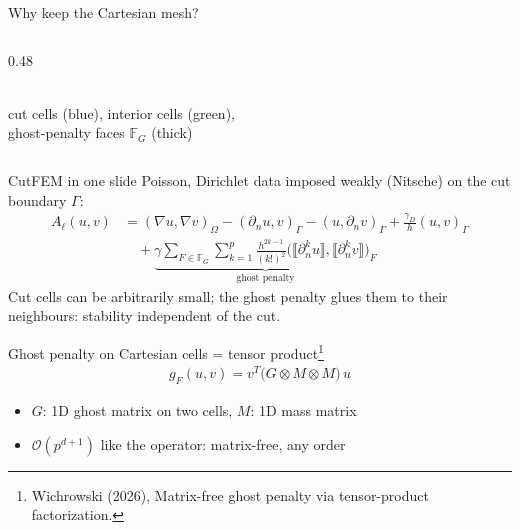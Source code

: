 \documentclass{beamer}
\begin{document}
\begin{frame}{Why keep the Cartesian mesh?}
\begin{columns}[T]
\begin{column}{0.48\textwidth}
\\[0.3em]
            {\scriptsize cut cells (blue), interior cells (green),\\ ghost-penalty faces $\mathbb F_G$ (thick)}
        \end{column}
    \end{columns}
\end{frame}

\begin{frame}{CutFEM in one slide}
    \small
    Poisson, Dirichlet data imposed weakly (Nitsche) on the cut boundary $\Gamma$:
    \begin{align*}
        A_\ell(u,v) & = (\nabla u,\nabla v)_\Omega - (\partial_n u, v)_\Gamma - (u,\partial_n v)_\Gamma
        + \tfrac{\gamma_D}{h}(u,v)_\Gamma                                                                    \\
                    & \quad + \underbrace{\gamma\sum_{F\in\mathbb F_G}\sum_{k=1}^{p}\tfrac{h^{2k-1}}{(k!)^2}
            \big(\llbracket\partial_n^k u\rrbracket, \llbracket\partial_n^k v\rrbracket\big)_F}_{\text{ghost penalty}}
    \end{align*}
    Cut cells can be \alert{arbitrarily small}; the \alert{ghost penalty} glues them to their neighbours:
    stability independent of the cut.
    \pause
    \begin{block}{Ghost penalty on Cartesian cells = tensor product\footnote{Wichrowski (2026), Matrix-free ghost penalty
                via tensor-product factorization.}}
        \vspace{-1.2em}
        \begin{gather*}
            g_F(u,v) = v^T \bigl(G \otimes M \otimes M\bigr)\, u
        \end{gather*}
        \vspace{-1.8em}
        \begin{itemize}
            \item $G$: 1D ghost matrix on two cells, $M$: 1D mass matrix
            \item $\mathcal O(p^{d+1})$ like the operator: matrix-free, any order
        \end{itemize}
    \end{block}
\end{frame}
\end{document}
